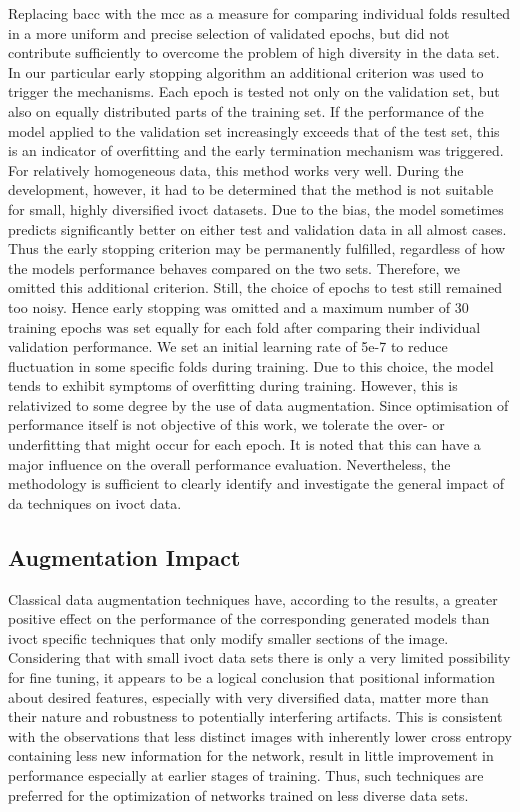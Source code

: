 Replacing \acrshort{bacc} with the \acrshort{mcc} as a measure for comparing individual folds resulted in a more uniform and precise selection of validated epochs, but did not contribute sufficiently to overcome the problem of high diversity in the data set. In our particular early stopping algorithm an additional criterion was used to trigger the mechanisms. Each epoch is tested not only on the validation set, but also on equally distributed parts of the training set. If the performance of the model applied to the validation set increasingly exceeds that of the test set, this is an indicator of \gls{overfitting} and the early termination mechanism was triggered. For relatively homogeneous data, this method works very well. During the development, however, it had to be determined that the method is not suitable for small, highly diversified \acrshort{ivoct} datasets. Due to the bias, the model sometimes predicts significantly better on either test and validation data in all almost cases. Thus the early stopping criterion may be permanently fulfilled, regardless of how the models performance behaves compared on the two sets. Therefore, we omitted this additional criterion. Still, the choice of epochs to test still remained too noisy. Hence early stopping was omitted and a maximum number of 30 training epochs was set equally for each fold after comparing their individual validation performance. We set an initial learning rate of 5e-7 to reduce fluctuation in some specific folds during training. Due to this choice, the model tends to exhibit symptoms of \gls{overfitting} during training. However, this is relativized to some degree by the use of data augmentation. Since optimisation of performance itself is not objective of this work, we tolerate the over- or underfitting that might occur for each epoch. It is noted that this can have a major influence on the overall performance evaluation. Nevertheless, the methodology is sufficient to clearly identify and investigate the general impact of \acrshort{da} techniques on \acrshort{ivoct} data.

\subsection{Augmentation Impact}

Classical data augmentation techniques have, according to the results, a greater positive effect on the performance of the corresponding generated models than \acrshort{ivoct} specific techniques that only modify smaller sections of the image. Considering that with small \acrshort{ivoct} data sets there is only a very limited possibility for fine tuning, it appears to be a logical conclusion that positional information about desired features, especially with very diversified data, matter more than their nature and robustness to potentially interfering artifacts. This is consistent with the observations that less distinct images with inherently lower cross entropy containing less new information for the network, result in little improvement in performance especially at earlier stages of training. Thus, such techniques are preferred for the optimization of networks trained on less diverse data sets.

